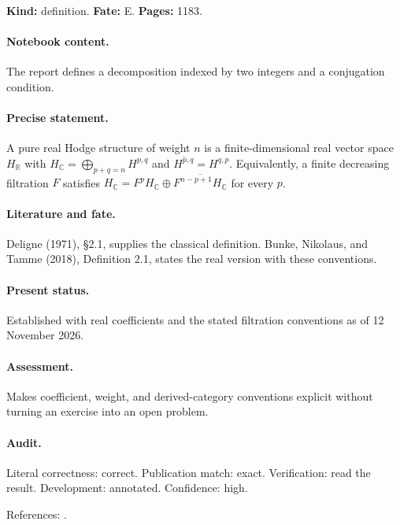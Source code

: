 \label{item:1983-630.1}

\noindent\textbf{Kind:} definition. \textbf{Fate:} E. \textbf{Pages:} 1183.\par

\paragraph{Notebook content.} The report defines a decomposition indexed by two integers and a conjugation condition.

\paragraph{Precise statement.} A pure real Hodge structure of weight \(n\) is a finite-dimensional real vector space \(H_{\mathbb R}\) with \(H_{\mathbb C}=\bigoplus_{p+q=n}H^{p,q}\) and \(\overline{H^{p,q}}=H^{q,p}\). Equivalently, a finite decreasing filtration \(F\) satisfies \(H_{\mathbb C}=F^pH_{\mathbb C}\oplus\overline{F^{n-p+1}H_{\mathbb C}}\) for every \(p\).

\paragraph{Literature and fate.} Deligne (1971), \S2.1, supplies the classical definition. Bunke, Nikolaus, and Tamme (2018), Definition 2.1, states the real version with these conventions.

\paragraph{Present status.} Established with real coefficients and the stated filtration conventions as of 12 November 2026.

\paragraph{Assessment.} Makes coefficient, weight, and derived-category conventions explicit without turning an exercise into an open problem.

\paragraph{Audit.} Literal correctness: correct. Publication match: exact. Verification: read the result. Development: annotated. Confidence: high.

\noindent References: \citep{deligne1971hodge,bunkenikolaustamme2018regulator}.\par

